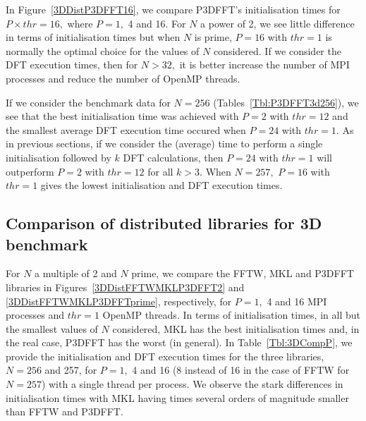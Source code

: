 \documentclass[a4paper]{article}
\begin{document}
In Figure~\ref{3DDistP3DFFT16}, we compare P3DFFT's initialisation
times for $P\times thr=16,$ where $P=1,$ 4 and 16. For $N$ a power of
2, we see little difference in terms of initialisation times but when
$N$ is prime, $P=16$ with $thr=1$ is normally the optimal choice for
the values of $N$ considered. If we consider the DFT execution times,
then for $N>32,$ it is better increase the number of MPI processes and
reduce the number of OpenMP threads.

If we consider the benchmark data for $N=256$
(Tables~\ref{Tbl:P3DFFT3d256}), we see that the best initialisation
time was achieved with $P=2$ with $thr=12$ and the smallest average
DFT execution time occured when $P=24$ with $thr=1.$ As in previous
sections, if we consider the (average) time to perform a single
initialisation followed by $k$ DFT calculations, then $P=24$ with
$thr=1$ will outperform $P=2$ with $thr=12$ for all $k>3.$ When
$N=257,$ $P=16$ with $thr=1$ gives the lowest initialisation and DFT
execution times.





\subsection{Comparison of distributed libraries for 3D benchmark}\label{Sec:3DDistComp}

For $N$ a multiple of 2 and $N$ prime, we compare the FFTW, MKL and
P3DFFT libraries in Figures~\ref{3DDistFFTWMKLP3DFFT2} and
\ref{3DDistFFTWMKLP3DFFTprime}, respectively, for $P=1,$ 4 and 16 MPI
processes and $thr=1$ OpenMP threads. In terms of initialisation
times, in all but the smallest values of $N$ considered, MKL has the
best initialisation times and, in the real case, P3DFFT has the worst
(in general). In Table~\ref{Tbl:3DCompP}, we provide the
initialisation and DFT execution times for the three libraries,
$N=256$ and 257, for $P=1,$ 4 and 16 (8 instead of 16 in the case of
FFTW for $N=257$) with a single thread per process. We observe the
stark differences in initialisation times with MKL having times
several orders of magnitude smaller than FFTW and P3DFFT.
\end{document}

